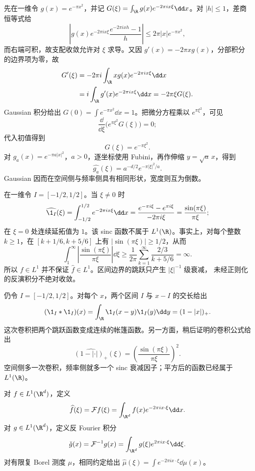 \begin{example}[Gaussian]\label{ex:7-2-2-1}
先在一维令 $g(x)=e^{-\pi x^2}$，并记
$G(\xi)=\int_\R g(x)e^{-2\pi ix\xi}\dd x$。对 $|h|\leq1$，差商恒等式给
\[
 \left|g(x)e^{-2\pi ix\xi}
       \frac{e^{-2\pi ixh}-1}{h}\right|
 \leq2\pi|x|e^{-\pi x^2},
\]
而右端可积，故支配收敛允许对 $\xi$ 求导。又因
$g'(x)=-2\pi xg(x)$，分部积分的边界项为零，故
\begin{align*}
 G'(\xi)
 &=-2\pi i\int_\R xg(x)e^{-2\pi ix\xi}\dd x\\
 &=i\int_\R g'(x)e^{-2\pi ix\xi}\dd x
 =-2\pi\xi G(\xi).
\end{align*}
Gaussian 积分给出 $G(0)=\int e^{-\pi x^2}\dd x=1$。把微分方程乘以
$e^{\pi\xi^2}$，可见
\[
 \frac{\dd}{\dd\xi}\bigl(e^{\pi\xi^2}G(\xi)\bigr)=0;
\]
代入初值得到
\[
 G(\xi)=e^{-\pi\xi^2}.
\]
对 $g_a(x)=e^{-\pi a|x|^2}$，$a>0$，逐坐标使用 Fubini，再作伸缩
$y=\sqrt a\,x$，得到
\begin{equation}\label{eq:7-2-gaussian-transform}
 \widehat{g_a}(\xi)=a^{-d/2}e^{-\pi|\xi|^2/a}.
\end{equation}
Gaussian 因而在空间侧与频率侧具有相同形状，宽度则互为倒数。
\end{example}

\begin{example}[区间指标]\label{ex:7-2-2-2}
在一维令 $I=[-1/2,1/2]$。当 $\xi\neq0$ 时
\[
 \widehat{\1_I}(\xi)
 =\int_{-1/2}^{1/2}e^{-2\pi ix\xi}\dd x
 =\frac{e^{-\pi i\xi}-e^{\pi i\xi}}{-2\pi i\xi}
 =\frac{\sin(\pi\xi)}{\pi\xi};
\]
在 $\xi=0$ 处连续延拓值为 $1$。该 sinc 函数不属于 $L^1(\R)$。事实上，对每个整数
$k\geq1$，在 $[k+1/6,k+5/6]$ 上有 $|\sin(\pi\xi)|\geq1/2$，从而
\[
 \int_1^\infty\left|\frac{\sin(\pi\xi)}{\pi\xi}\right|\dd\xi
 \geq\frac1{2\pi}\sum_{k=1}^\infty
   \frac{2/3}{k+5/6}=\infty.
\]
所以 $f\in L^1$ 并不保证 $\widehat f\in L^1$。区间边界的跳跃只产生 $|\xi|^{-1}$ 级衰减，
未经正则化的反演积分不绝对收敛。
\end{example}

\begin{example}[卷积平滑]\label{ex:7-2-2-3}
仍令 $I=[-1/2,1/2]$。对每个 $x$，两个区间 $I$ 与 $x-I$ 的交长给出
\[
 (\1_I*\1_I)(x)
 =\int_\R\1_I(x-y)\1_I(y)\dd y
 =(1-|x|)_+.
\]
这次卷积把两个跳跃函数变成连续的帐篷函数。另一方面，稍后证明的卷积公式给出
\[
 \widehat{(1-|\cdot|)_+}(\xi)
 =\left(\frac{\sin(\pi\xi)}{\pi\xi}\right)^2.
\]
空间侧多一次卷积，频率侧就多一个 sinc 衰减因子；平方后的函数已经属于 $L^1(\R)$。
\end{example}

\begin{definition}\label{def:7-2-2-1}
对 $f\in L^1(\R^d)$，定义
\[
 \widehat f(\xi)=\mathcal Ff(\xi)
 =\int_{\R^d}f(x)e^{-2\pi ix\cdot\xi}\dd x.
\]
对 $g\in L^1(\R^d)$，定义反 Fourier 积分
\[
 \check g(x)=\mathcal F^{-1}g(x)
 =\int_{\R^d}g(\xi)e^{2\pi ix\cdot\xi}\dd\xi.
\]
对有限复 Borel 测度 $\mu$，相同约定给出
$\widehat\mu(\xi)=\int e^{-2\pi ix\cdot\xi}\dd\mu(x)$。
\end{definition}

